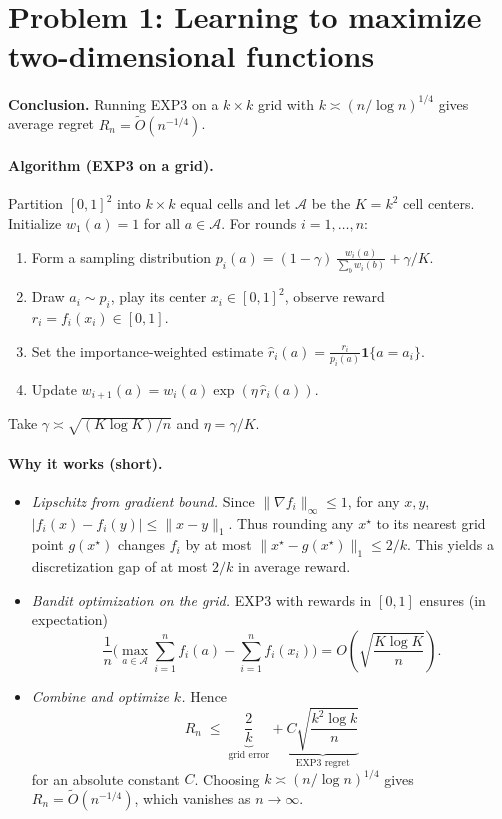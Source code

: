 \documentclass[11pt]{article}
\renewenvironment{shaded}{%
  \def\FrameCommand{\fboxsep=\FrameSep \colorbox{shadecolor}}%
  \MakeFramed{\advance\hsize-\width \FrameRestore\FrameRestore}}%
 {\endMakeFramed}
\begin{document}
\begin{shaded}
\section*{Problem 1: Learning to maximize two-dimensional functions}
\textbf{Conclusion.} Running EXP3 on a $k\times k$ grid with $k \asymp (n/\log n)^{1/4}$ gives average regret $R_n=\tilde{O}(n^{-1/4})$.

\paragraph{Algorithm (EXP3 on a grid).}
Partition $[0,1]^2$ into $k\times k$ equal cells and let $\mathcal{A}$ be the $K=k^2$ cell centers.
Initialize $w_1(a)=1$ for all $a\in\mathcal{A}$. For rounds $i=1,\dots,n$:
\begin{enumerate}[leftmargin=1.5em,itemsep=0.2em]
\item Form a sampling distribution $p_i(a)=(1-\gamma)\,\frac{w_i(a)}{\sum_{b}w_i(b)}+\gamma/K$.
\item Draw $a_i\sim p_i$, play its center $x_i\in[0,1]^2$, observe reward $r_i=f_i(x_i)\in[0,1]$.
\item Set the importance-weighted estimate $\hat r_i(a)=\frac{r_i}{p_i(a)}\mathbf{1}\{a=a_i\}$.
\item Update $w_{i+1}(a)=w_i(a)\exp(\eta\,\hat r_i(a))$.
\end{enumerate}
Take $\gamma \asymp \sqrt{(K\log K)/n}$ and $\eta=\gamma/K$.

\paragraph{Why it works (short).}
\begin{itemize}[leftmargin=1.5em,itemsep=0.2em]
\item \emph{Lipschitz from gradient bound.} Since $\|\nabla f_i\|_\infty\le 1$, for any $x,y$,
$|f_i(x)-f_i(y)|\le \|x-y\|_1$. Thus rounding any $x^\star$ to its nearest grid point $g(x^\star)$ changes $f_i$ by at most $\|x^\star-g(x^\star)\|_1\le 2/k$.
This yields a discretization gap of at most $2/k$ in average reward.
\item \emph{Bandit optimization on the grid.} EXP3 with rewards in $[0,1]$ ensures (in expectation)
\[
\frac{1}{n}\Big(\max_{a\in\mathcal{A}}\sum_{i=1}^n f_i(a)-\sum_{i=1}^n f_i(x_i)\Big)
= O\!\left(\sqrt{\frac{K\log K}{n}}\right).
\]
\item \emph{Combine and optimize $k$.} Hence
\[
R_n \;\le\; \underbrace{\frac{2}{k}}_{\text{grid error}}
+\underbrace{C\sqrt{\frac{k^2\log k}{n}}}_{\text{EXP3 regret}}
\]
for an absolute constant $C$. Choosing $k\asymp (n/\log n)^{1/4}$ gives
$R_n=\tilde{O}(n^{-1/4})$, which vanishes as $n\to\infty$.
\end{itemize}


\end{shaded}
\end{document}

